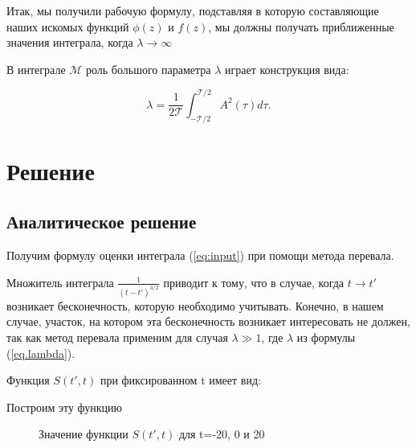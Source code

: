 \documentclass[%
bachelor,    %
natbib,      %
subf,        %
href,        %
colorlinks,  %
]{disser}
\newcommand{\sectionbreak}{\clearpage}
\newcommand{\cM}{\mathcal{M}}
\newcommand{\cT}{\mathcal{T}}
\begin{document}
	Итак, мы получили рабочую формулу, подставляя в которую составляющие наших искомых функций $\phi (z)$ и $f (z)$, мы должны получать приближенные значения интеграла, когда $\lambda \rightarrow \infty$ 
	
	В интеграле $\cM$ роль большого параметра $\lambda$ играет конструкция вида:
	
	\begin{equation}\label{eq.lambda}
	\lambda = \frac{1}{2 \cT} \int_{-\cT/2}^{\cT/2} A^2(\tau) d\tau.
	\end{equation}

\sectionbreak
\section{Решение}
\subsection{Аналитическое решение}
Получим формулу оценки интеграла (\ref{eq:input}) при помощи метода перевала.

Множитель интеграла $\frac{1}{(t-t')^{3/2}}$ приводит к тому, что в случае, когда $t \rightarrow t'$ возникает бесконечность, которую  необходимо учитывать. Конечно, в нашем случае, участок, на котором эта бесконечность возникает интересовать не должен, так как метод перевала применим для случая $\lambda \gg 1$, где $\lambda$ из формулы (\ref{eq.lambda}).  

Функция $S(t', t)$ при фиксированном t имеет вид:

Построим эту функцию 

\begin{figure}[h]
	\caption{Значение функции $S(t', t)$ для t=-20, 0 и 20}
	\label{ris:S}
\end{figure}
\end{document}
